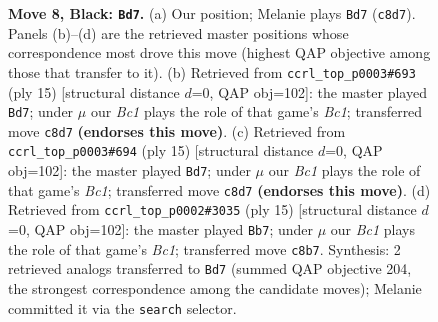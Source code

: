 \documentclass[11pt]{article}
\begin{document}
\begin{figure}[p]
\caption{\textbf{Move 8, Black: \texttt{Bd7}.} (a) Our position; Melanie plays \texttt{Bd7} (\texttt{c8d7}). Panels (b)--(d) are the retrieved master positions whose correspondence most drove this move (highest QAP objective among those that transfer to it). (b) Retrieved from \texttt{ccrl\_top\_p0003\#693} (ply 15) [structural distance $d$=0, QAP obj=102]: the master played \texttt{Bd7}; under $\mu$ our \emph{Bc1} plays the role of that game's \emph{Bc1}; transferred move \texttt{c8d7} \textbf{(endorses this move)}. (c) Retrieved from \texttt{ccrl\_top\_p0003\#694} (ply 15) [structural distance $d$=0, QAP obj=102]: the master played \texttt{Bd7}; under $\mu$ our \emph{Bc1} plays the role of that game's \emph{Bc1}; transferred move \texttt{c8d7} \textbf{(endorses this move)}. (d) Retrieved from \texttt{ccrl\_top\_p0002\#3035} (ply 15) [structural distance $d$=0, QAP obj=102]: the master played \texttt{Bb7}; under $\mu$ our \emph{Bc1} plays the role of that game's \emph{Bc1}; transferred move \texttt{c8b7}. Synthesis: 2 retrieved analogs transferred to \texttt{Bd7} (summed QAP objective 204, the strongest correspondence among the candidate moves); Melanie committed it via the \texttt{search} selector.}
\label{fig:thought-m15}
\end{figure}

\clearpage
\end{document}
